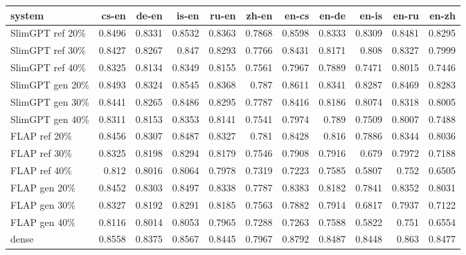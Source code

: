 \begin{tabular}{lrrrrrrrrrr}
\toprule
system & cs-en & de-en & is-en & ru-en & zh-en & en-cs & en-de & en-is & en-ru & en-zh \\
\midrule
SlimGPT ref 20\% & 0.8496 & 0.8331 & 0.8532 & 0.8363 & 0.7868 & 0.8598 & 0.8333 & 0.8309 & 0.8481 & 0.8295 \\
SlimGPT ref 30\% & 0.8427 & 0.8267 & 0.847 & 0.8293 & 0.7766 & 0.8431 & 0.8171 & 0.808 & 0.8327 & 0.7999 \\
SlimGPT ref 40\% & 0.8325 & 0.8134 & 0.8349 & 0.8155 & 0.7561 & 0.7967 & 0.7889 & 0.7471 & 0.8015 & 0.7446 \\
SlimGPT gen 20\% & 0.8493 & 0.8324 & 0.8545 & 0.8368 & 0.787 & 0.8611 & 0.8341 & 0.8287 & 0.8469 & 0.8283 \\
SlimGPT gen 30\% & 0.8441 & 0.8265 & 0.8486 & 0.8295 & 0.7787 & 0.8416 & 0.8186 & 0.8074 & 0.8318 & 0.8005 \\
SlimGPT gen 40\% & 0.8311 & 0.8153 & 0.8353 & 0.8141 & 0.7541 & 0.7974 & 0.789 & 0.7509 & 0.8007 & 0.7488 \\
FLAP ref 20\% & 0.8456 & 0.8307 & 0.8487 & 0.8327 & 0.781 & 0.8428 & 0.816 & 0.7886 & 0.8344 & 0.8036 \\
FLAP ref 30\% & 0.8325 & 0.8198 & 0.8294 & 0.8179 & 0.7546 & 0.7908 & 0.7916 & 0.679 & 0.7972 & 0.7188 \\
FLAP ref 40\% & 0.812 & 0.8016 & 0.8064 & 0.7978 & 0.7319 & 0.7223 & 0.7585 & 0.5807 & 0.752 & 0.6505 \\
FLAP gen 20\% & 0.8452 & 0.8303 & 0.8497 & 0.8338 & 0.7787 & 0.8383 & 0.8182 & 0.7841 & 0.8352 & 0.8031 \\
FLAP gen 30\% & 0.8327 & 0.8192 & 0.8291 & 0.8185 & 0.7563 & 0.7882 & 0.7914 & 0.6817 & 0.7937 & 0.7122 \\
FLAP gen 40\% & 0.8116 & 0.8014 & 0.8053 & 0.7965 & 0.7288 & 0.7263 & 0.7588 & 0.5822 & 0.751 & 0.6554 \\
dense & 0.8558 & 0.8375 & 0.8567 & 0.8445 & 0.7967 & 0.8792 & 0.8487 & 0.8448 & 0.863 & 0.8477 \\
\bottomrule
\end{tabular}
